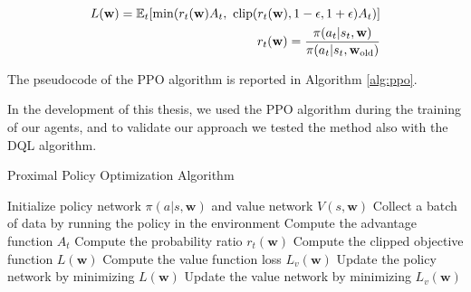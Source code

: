 \begin{equation} \label{eq:ppo_objective}
\begin{split}
    L(\textbf{w}) = \E_t [\min( r_t(\textbf{w})A_t, \ \text{clip}(r_t(\textbf{w}), 1-\epsilon, 1+\epsilon)A_t)] \\
    r_t(\textbf{w}) = \frac{\pi(a_t|s_t, \textbf{w})}{\pi(a_t|s_t, \textbf{w}_{\text{old}})}
\end{split}
\end{equation}

The pseudocode of the PPO algorithm is reported in Algorithm \ref{alg:ppo}.



In the development of this thesis, we used the PPO algorithm during the training of our agents, and to validate our approach we tested the method also with the DQL algorithm.



\begin{algorithm}
\caption{Proximal Policy Optimization Algorithm}\label{alg:ppo}
\begin{algorithmic}
\State Initialize policy network $\pi(a|s, \textbf{w})$ and value network $V(s, \textbf{w})$
        \State Collect a batch of data by running the policy in the environment
        \State Compute the advantage function $A_t$
        \State Compute the probability ratio $r_t(\textbf{w})$
        \State Compute the clipped objective function $L(\textbf{w})$
        \State Compute the value function loss $L_v(\textbf{w})$
        \State Update the policy network by minimizing $L(\textbf{w})$
        \State Update the value network by minimizing $L_v(\textbf{w})$
    \EndFor
\EndFor
\end{algorithmic}
\end{algorithm}

